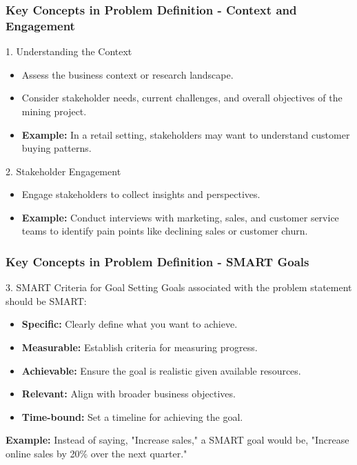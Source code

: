 \documentclass[aspectratio=169]{beamer}
\begin{document}
\begin{frame}[fragile]
    \frametitle{Key Concepts in Problem Definition - Context and Engagement}
    \begin{block}{1. Understanding the Context}
        \begin{itemize}
            \item Assess the business context or research landscape.
            \item Consider stakeholder needs, current challenges, and overall objectives of the mining project.
            \item \textbf{Example:} In a retail setting, stakeholders may want to understand customer buying patterns.
        \end{itemize}
    \end{block}
    
    \begin{block}{2. Stakeholder Engagement}
        \begin{itemize}
            \item Engage stakeholders to collect insights and perspectives.
            \item \textbf{Example:} Conduct interviews with marketing, sales, and customer service teams to identify pain points like declining sales or customer churn.
        \end{itemize}
    \end{block}
\end{frame}

\begin{frame}[fragile]
    \frametitle{Key Concepts in Problem Definition - SMART Goals}
    \begin{block}{3. SMART Criteria for Goal Setting}
        Goals associated with the problem statement should be SMART:
        \begin{itemize}
            \item \textbf{Specific:} Clearly define what you want to achieve.
            \item \textbf{Measurable:} Establish criteria for measuring progress.
            \item \textbf{Achievable:} Ensure the goal is realistic given available resources.
            \item \textbf{Relevant:} Align with broader business objectives.
            \item \textbf{Time-bound:} Set a timeline for achieving the goal.
        \end{itemize}
        \textbf{Example:} Instead of saying, "Increase sales," a SMART goal would be, "Increase online sales by 20\% over the next quarter."
    \end{block}
\end{frame}
\end{document}
